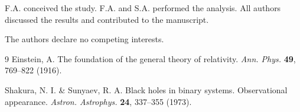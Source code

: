\documentclass[10pt,a4paper,twocolumn]{article}
\begin{document}
\authorcontributions
F.A. conceived the study. F.A. and S.A. performed the analysis. All authors discussed the results and contributed to the manuscript.

\competinginterests
The authors declare no competing interests.

\begin{thebibliography}{9}
  Einstein, A. The foundation of the general theory of relativity. \textit{Ann. Phys.} \textbf{49}, 769--822 (1916).

  Shakura, N. I. \& Sunyaev, R. A. Black holes in binary systems. Observational appearance. \textit{Astron. Astrophys.} \textbf{24}, 337--355 (1973).
\end{thebibliography}
% 

\makeendmatter
\end{document}
